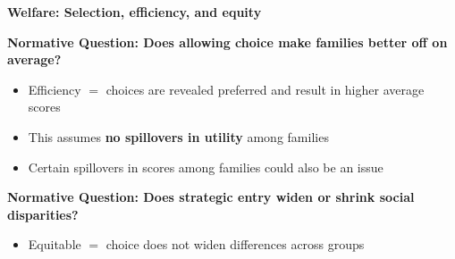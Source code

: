 \documentclass[t,aspectratio=169,11pt,presentation]{beamer}
\newenvironment{wideitemize}{\itemize\addtolength{\itemsep}{14pt}}{\enditemize}
\begin{document}
	
	
	
	\begin{frame}[label=wait3]{\textbf{Welfare: Selection, efficiency, and equity}}
		\begin{wideitemize}
			\item<2-> {\textbf{Normative Question: Does allowing choice make families better off on average?}}
			\begin{itemize}
				\item Efficiency $=$ choices are revealed preferred and result in higher average scores
				
				
				\item<3->This assumes \textbf{no spillovers in utility} among families
				
				
				\item<4-> Certain spillovers in scores among families could also be an issue
				
				{\tiny \color{gray} \citep{bedard2012school,cascio2016first,pena2017creating}}
				
			\end{itemize}
			
			\item<5-> {\textbf{Normative Question: Does strategic entry widen or shrink social disparities?}}
			\begin{itemize}
				\item Equitable $=$ choice does not widen differences across groups
				
				
				
				
			\end{itemize}
				

\end{wideitemize}
\end{frame}
\end{document}
